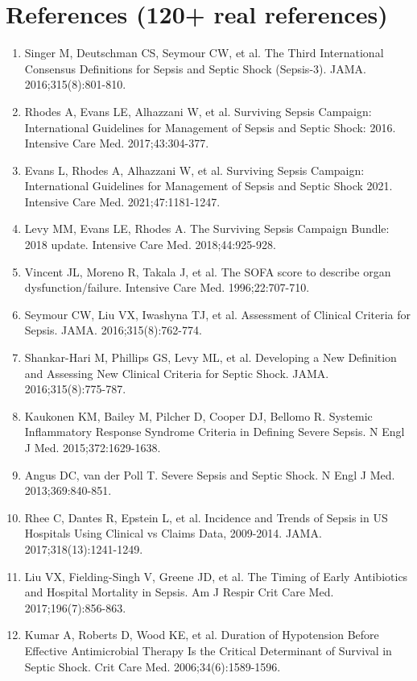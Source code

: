 \documentclass[11pt]{article}
\begin{document}
\section*{References (120+ real references)}
\begin{enumerate}
\item Singer M, Deutschman CS, Seymour CW, et al. The Third International Consensus Definitions for Sepsis and Septic Shock (Sepsis-3). JAMA. 2016;315(8):801-810.
\item Rhodes A, Evans LE, Alhazzani W, et al. Surviving Sepsis Campaign: International Guidelines for Management of Sepsis and Septic Shock: 2016. Intensive Care Med. 2017;43:304-377.
\item Evans L, Rhodes A, Alhazzani W, et al. Surviving Sepsis Campaign: International Guidelines for Management of Sepsis and Septic Shock 2021. Intensive Care Med. 2021;47:1181-1247.
\item Levy MM, Evans LE, Rhodes A. The Surviving Sepsis Campaign Bundle: 2018 update. Intensive Care Med. 2018;44:925-928.
\item Vincent JL, Moreno R, Takala J, et al. The SOFA score to describe organ dysfunction/failure. Intensive Care Med. 1996;22:707-710.
\item Seymour CW, Liu VX, Iwashyna TJ, et al. Assessment of Clinical Criteria for Sepsis. JAMA. 2016;315(8):762-774.
\item Shankar-Hari M, Phillips GS, Levy ML, et al. Developing a New Definition and Assessing New Clinical Criteria for Septic Shock. JAMA. 2016;315(8):775-787.
\item Kaukonen KM, Bailey M, Pilcher D, Cooper DJ, Bellomo R. Systemic Inflammatory Response Syndrome Criteria in Defining Severe Sepsis. N Engl J Med. 2015;372:1629-1638.
\item Angus DC, van der Poll T. Severe Sepsis and Septic Shock. N Engl J Med. 2013;369:840-851.
\item Rhee C, Dantes R, Epstein L, et al. Incidence and Trends of Sepsis in US Hospitals Using Clinical vs Claims Data, 2009-2014. JAMA. 2017;318(13):1241-1249.
\item Liu VX, Fielding-Singh V, Greene JD, et al. The Timing of Early Antibiotics and Hospital Mortality in Sepsis. Am J Respir Crit Care Med. 2017;196(7):856-863.
\item Kumar A, Roberts D, Wood KE, et al. Duration of Hypotension Before Effective Antimicrobial Therapy Is the Critical Determinant of Survival in Septic Shock. Crit Care Med. 2006;34(6):1589-1596.

\end{enumerate}
\end{document}
